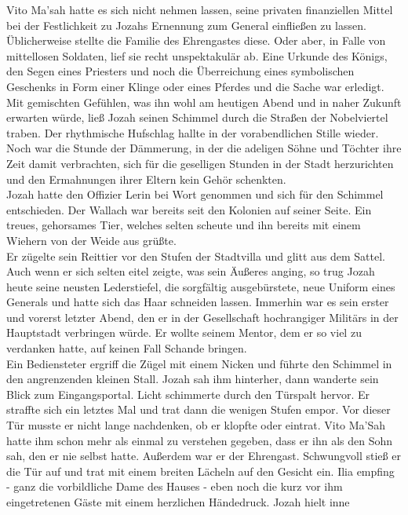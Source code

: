 Vito Ma'sah hatte es sich nicht nehmen lassen, seine privaten finanziellen Mittel bei der 
Festlichkeit zu Jozahs Ernennung zum General einfließen zu lassen. Üblicherweise stellte die 
Familie des Ehrengastes diese. Oder aber, in Falle von mittellosen Soldaten, lief sie recht 
unspektakulär ab. Eine Urkunde des Königs, den Segen eines Priesters und noch die Überreichung 
eines symbolischen Geschenks in Form einer Klinge oder eines Pferdes und die Sache war erledigt.\\
Mit gemischten Gefühlen, was ihn wohl am heutigen Abend und in naher Zukunft erwarten würde, ließ 
Jozah seinen Schimmel durch die Straßen der Nobelviertel traben. Der rhythmische Hufschlag hallte 
in der vorabendlichen Stille wieder. Noch war die Stunde der Dämmerung, in der die adeligen Söhne 
und Töchter ihre Zeit damit verbrachten, sich für die geselligen Stunden in der Stadt herzurichten 
und den Ermahnungen ihrer Eltern kein Gehör schenkten.\\
Jozah hatte den Offizier Lerin bei Wort genommen und sich für den Schimmel entschieden. Der Wallach 
war bereits seit den Kolonien auf seiner Seite. Ein treues, gehorsames Tier, welches selten scheute 
und ihn bereits mit einem Wiehern von der Weide aus grüßte.\\
Er zügelte sein Reittier vor den Stufen der Stadtvilla und glitt aus dem Sattel. Auch wenn er sich 
selten eitel zeigte, was sein Äußeres anging, so trug Jozah heute seine neusten Lederstiefel, die 
sorgfältig ausgebürstete, neue Uniform eines Generals und hatte sich das Haar schneiden lassen. 
Immerhin war es sein erster und vorerst letzter Abend, den er in der Gesellschaft hochrangiger 
Militärs in der Hauptstadt verbringen würde. Er wollte seinem Mentor, dem er so viel zu verdanken 
hatte, auf keinen Fall Schande bringen.\\
Ein Bediensteter ergriff die Zügel mit einem Nicken und führte den Schimmel in den angrenzenden 
kleinen Stall. Jozah sah ihm hinterher, dann wanderte sein Blick zum Eingangsportal. Licht 
schimmerte durch den Türspalt hervor. Er straffte sich ein letztes Mal und trat dann die wenigen 
Stufen empor. Vor dieser Tür musste er nicht lange nachdenken, ob er klopfte oder eintrat. Vito 
Ma'Sah hatte ihm schon mehr als einmal zu verstehen gegeben, dass er ihn als den Sohn sah, den er 
nie selbst hatte. Außerdem war er der Ehrengast. Schwungvoll stieß er die Tür auf und trat mit 
einem breiten Lächeln auf den Gesicht ein. Ilia empfing - ganz die vorbildliche Dame des Hauses - 
eben noch die kurz vor ihm eingetretenen Gäste mit einem herzlichen Händedruck. Jozah hielt inne 
